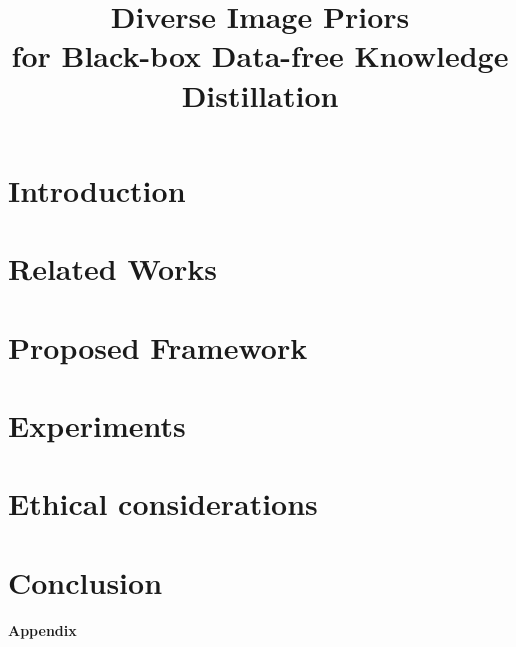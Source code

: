 \documentclass[10pt]{article} %
\title{Diverse Image Priors \\ for Black-box Data-free Knowledge Distillation}
\author{}
\begin{document}
\maketitle

\begin{abstract} \label{sec:00-abstract}
    
\end{abstract}

\section{Introduction} \label{sec:01-introduction}


\section{Related Works} \label{sec:02-related}


\section{Proposed Framework} \label{sec:03-framework}


\section{Experiments} \label{sec:04-experiments}


\section{Ethical considerations} \label{sec:05-ethical}


\section{Conclusion} \label{sec:06-conclusion}







\appendix
\newpage
{\Large \centering \textbf{Appendix}\par} %
\vspace{0.5\baselineskip}

\end{document}
